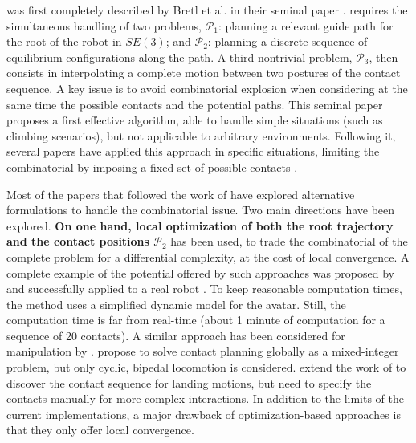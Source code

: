  was first completely described by Bretl et al. in their seminal paper  \citep{Bretl:2006:MPM:1124573.1124585}.  requires the simultaneous handling of two problems, $\mathcal{P}_1$: planning a relevant guide path for the root of the robot in $SE(3)$; and $\mathcal{P}_2$: planning a discrete sequence of  equilibrium configurations along the path. A third nontrivial problem, $\mathcal{P}_3$, 
then consists in interpolating a complete motion between two postures of the contact sequence.  A key issue is to avoid combinatorial explosion when considering at the same time the possible contacts and the potential paths. This seminal paper proposes a first effective algorithm, able to handle simple situations (such as climbing scenarios), but not applicable to arbitrary environments. Following it, seve\-ral papers have applied this approach in specific situations, limiting the combinatorial by imposing a fixed set of possible contacts \citep{Hauser06usingmotion, stilman2010}.

Most of the papers that followed the work of \citeauthor{Bretl:2006:MPM:1124573.1124585} have explored alternative formulations to handle the combinatorial issue. Two main directions have been explored. \textbf{On one hand, local optimization of both the root trajectory \Pa and the contact positions $\mathcal{P}_2$} has been used, to trade the combinatorial of the complete problem for a differential complexity, at the cost of local convergence. A complete example of the potential offered by such approaches was proposed by \cite{Mordatch:2012:DCB:2185520.2185539} and successfully applied to a real robot \citep{mordatch2015}. To keep reasonable computation times, the method uses a simplified dynamic model for the avatar. Still, the computation time is far from real-time  (about 1 minute of computation for a sequence of 20 contacts).  A similar approach has been considered for manipulation by \cite{gabicciniisrr15}. \citeauthor{DBLP:conf/humanoids/DeitsT14} propose to solve contact planning globally as a mixed-integer problem, but only cyclic, bipedal locomotion is considered. 
\citeauthor{dai2014whole} extend the work of \citeauthor{Posa:2014:DMT:2568343.2568352} to discover the contact sequence for landing motions, but need to specify
the contacts manually for more complex interactions.
In addition to the limits of the current implementations, a major drawback of optimization-based approaches is that they only offer local convergence.

